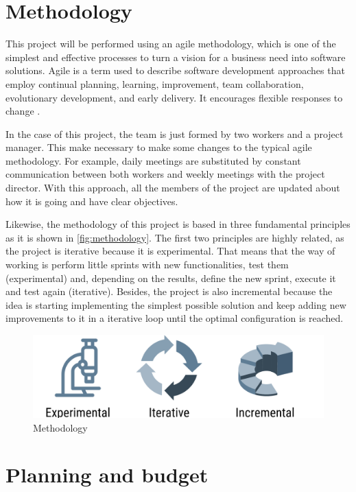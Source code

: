 	\section{Methodology}
		This project will be performed using an agile methodology, which is one of the simplest and effective processes to turn a vision for a business need into software solutions. Agile is a term used to describe software development approaches that employ continual planning, learning, improvement, team collaboration, evolutionary development, and early delivery. It encourages flexible responses to change \cite{noauthor_agile_nodate}.
		
		In the case of this project, the team is just formed by two workers and a project manager. This make necessary to make some changes to the typical agile methodology. For example, daily meetings are substituted by constant communication between both workers and weekly meetings with the project director. With this approach, all the members of the project are updated about how it is going and have clear objectives.
		
		Likewise, the methodology of this project is based in three fundamental principles as it is shown in \autoref{fig:methodology}. The first two principles are highly related, as the project is iterative because it is experimental. That means that the way of working is perform little sprints with new functionalities, test them (experimental) and, depending on the results, define the new sprint, execute it and test again (iterative). Besides, the project is also incremental because the idea is starting implementing the simplest possible solution and keep adding new improvements to it in a iterative loop until the optimal configuration is reached.
		
		\begin{figure}
			\centering
			\includegraphics[width=0.85\linewidth]{Images/methodology}
			\caption[Methodology]{Methodology}
			\label{fig:methodology}
		\end{figure}
		
	
	\section{Planning and budget}
	
